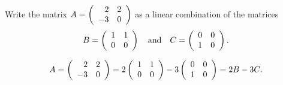 \documentclass{ximera}
\begin{document}
\begin{exercise} \label{c5.2.4}
Write the matrix $A=\mattwo{2}{2}{-3}{0}$ as a linear combination
of the matrices
\[
B=\mattwo{1}{1}{0}{0} \AND C=\mattwo{0}{0}{1}{0}.
\]

\begin{solution}

\[ A = \mattwo{2}{2}{-3}{0} = 2\mattwo{1}{1}{0}{0} -
3\mattwo{0}{0}{1}{0} = 2B - 3C. \]

\end{solution}
\end{exercise}
\end{document}
